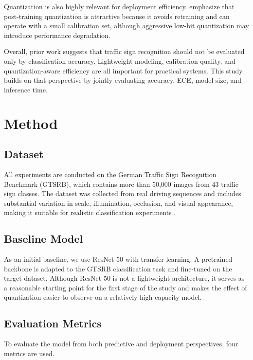 \documentclass{article} %
\begin{document}
Quantization is also highly relevant for deployment efficiency. \citet{hubara2021ptq} emphasize that post-training quantization is attractive because it avoids retraining and can operate with a small calibration set, although aggressive low-bit quantization may introduce performance degradation.

Overall, prior work suggests that traffic sign recognition should not be evaluated only by classification accuracy. Lightweight modeling, calibration quality, and quantization-aware efficiency are all important for practical systems. This study builds on that perspective by jointly evaluating accuracy, ECE, model size, and inference time.

\section{Method}

\subsection{Dataset}

All experiments are conducted on the German Traffic Sign Recognition Benchmark (GTSRB), which contains more than 50,000 images from 43 traffic sign classes. The dataset was collected from real driving sequences and includes substantial variation in scale, illumination, occlusion, and visual appearance, making it suitable for realistic classification experiments \citep{stallkamp2011gtsrb}.

\subsection{Baseline Model}

As an initial baseline, we use ResNet-50 with transfer learning. A pretrained backbone is adapted to the GTSRB classification task and fine-tuned on the target dataset. Although ResNet-50 is not a lightweight architecture, it serves as a reasonable starting point for the first stage of the study and makes the effect of quantization easier to observe on a relatively high-capacity model.

\subsection{Evaluation Metrics}

To evaluate the model from both predictive and deployment perspectives, four metrics are used.
\end{document}
